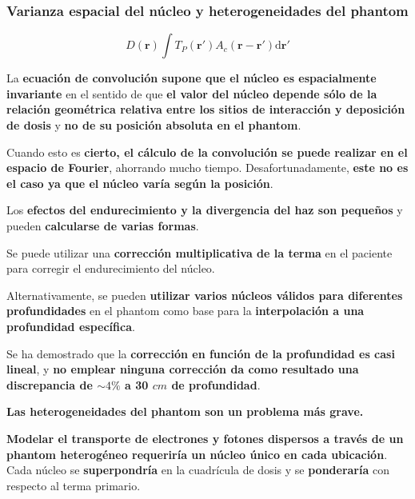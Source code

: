 \documentclass[aspectratio=169,xcolor=dvipsnames,t]{beamer}
\newcommand{\be}{\begin{equation*}}
\newcommand{\ee}{\end{equation*}}
\begin{document}
\begin{frame}

    \frametitle{Varianza espacial del núcleo y heterogeneidades del phantom}

    \be
    D(\mathbf{r}) \int T_P(\mathbf{r'}) A_c (\mathbf{r}-\mathbf{r'}) \text{d}\mathbf{r'}
    \ee

    La \textbf{ecuación de convolución supone que el núcleo es espacialmente invariante} en el sentido de que \textbf{el valor del núcleo depende sólo de la relación geométrica relativa entre los sitios de interacción y deposición de dosis} y \textbf{no de su posición absoluta en el phantom}.

    Cuando esto es \textbf{cierto, el cálculo de la convolución se puede realizar en el espacio de Fourier}, ahorrando mucho tiempo. Desafortunadamente, \textbf{este no es el caso ya que el núcleo varía según la posición}.

    Los \textbf{efectos del endurecimiento y la divergencia del haz son pequeños} y pueden \textbf{calcularse de varias formas}. 

\end{frame}

\begin{frame}

    Se puede utilizar una \textbf{corrección multiplicativa de la terma} en el paciente para corregir el endurecimiento del núcleo.

    Alternativamente, se pueden \textbf{utilizar varios núcleos válidos para diferentes profundidades} en el phantom como base para la \textbf{interpolación a una profundidad específica}. 

    Se ha demostrado que la \textbf{corrección en función de la profundidad es casi lineal}, y \textbf{no emplear ninguna corrección da como resultado una discrepancia de $\sim4\%$ a 30 $cm$ de profundidad}.

    \textbf{Las heterogeneidades del phantom son un problema más grave.}

    \textbf{Modelar el transporte de electrones y fotones dispersos a través de un phantom heterogéneo requeriría un núcleo único en cada ubicación}. Cada núcleo se \textbf{superpondría} en la cuadrícula de dosis y se \textbf{ponderaría} con respecto al terma primario.

\end{frame}
\end{document}
